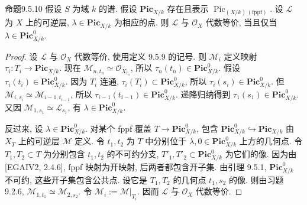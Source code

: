 \begin{origstatement}{命题}{9.5.10}\label{ch09s05:prop9.5.10}
假设 $S$ 为域 $k$ 的谱. 假设 $\mathbf{Pic}_{X/k}$ 存在且表示 $\operatorname{Pic}_{(X/k)\,\mathrm{(fppf)}}$. 设 $\mathcal L$ 为 $X$ 上的可逆层, $\lambda\in\mathbf{Pic}_{X/k}$ 为相应的点. 则 $\mathcal L$ 与 $\mathcal O_X$ 代数等价, 当且仅当 $\lambda\in\mathbf{Pic}^0_{X/k}$.
\end{origstatement}
\begin{proof}
设 $\mathcal L$ 与 $\mathcal O_X$ 代数等价, 使用定义 9.5.9 的记号. 则 $\mathcal M_i$ 定义映射 $\tau_i:T_i\to\mathbf{Pic}_{X/k}$. 现在 $\mathcal M_{n,t_n}\simeq\mathcal O_{X_{t_n}}$, 所以 $\tau_n(t_n)\in\mathbf{Pic}^0_{X/k}$. 假设 $\tau_i(t_i)\in\mathbf{Pic}^0_{X/k}$. 因为 $T_i$ 连通, $\tau_i(T_i)\subset\mathbf{Pic}^0_{X/k}$, 所以 $\tau_i(s_i)\in\mathbf{Pic}^0_{X/k}$. 但 $\mathcal M_{i,s_i}\simeq\mathcal M_{i-1,t_{i-1}}$, 所以 $\tau_{i-1}(t_{i-1})\in\mathbf{Pic}^0_{X/k}$. 递降归纳得到 $\tau_1(s_1)\in\mathbf{Pic}^0_{X/k}$. 又因 $\mathcal M_{1,s_1}\simeq\mathcal L_{s_1}$, 有 $\lambda\in\mathbf{Pic}^0_{X/k}$.

反过来, 设 $\lambda\in\mathbf{Pic}^0_{X/k}$. 对某个 fppf 覆盖 $T\to\mathbf{Pic}^0_{X/k}$, 包含 $\mathbf{Pic}^0_{X/k}\hookrightarrow\mathbf{Pic}_{X/k}$ 由 $X_T$ 上的可逆层 $\mathcal M$ 定义. 令 $t_1,t_2$ 为 $T$ 中分别位于 $\lambda,0\in\mathbf{Pic}^0_{X/k}$ 上方的几何点. 令 $T_1,T_2\subset T$ 为分别包含 $t_1,t_2$ 的不可约分支, $T'_1,T'_2\subset\mathbf{Pic}^0_{X/k}$ 为它们的像. 因为由 [EGAIV2, 2.4.6], fppf 映射为开映射, 后两者都包含开子集. 由引理 9.5.1, $\mathbf{Pic}^0_{X/k}$ 不可约, 这些开子集包含公共点. 设它是 $T_1,T_2$ 的几何点 $t_1,s_2$ 的像. 则由习题 9.2.6, $\mathcal M_{1,t_1}\simeq\mathcal M_{2,s_2}$. 令 $\mathcal M_i:=\mathcal M|_{T_i}$. 因而 $\mathcal L$ 与 $\mathcal O_X$ 代数等价.
\end{proof}


